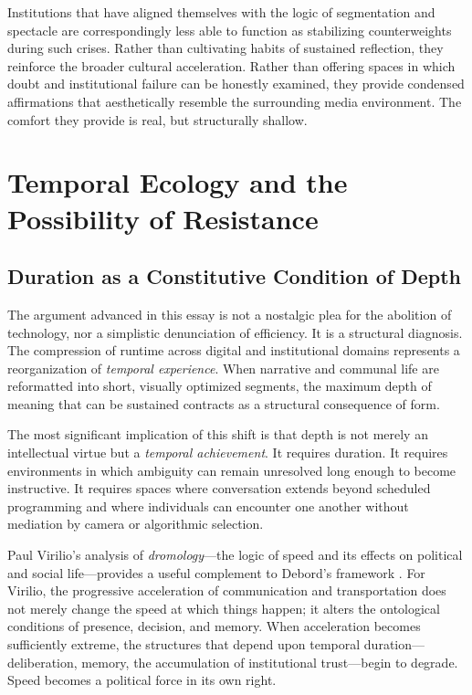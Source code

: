 \documentclass[11pt]{article}
\begin{document}
Institutions that have aligned themselves with the logic of segmentation and spectacle are correspondingly less able to function as stabilizing counterweights during such crises. Rather than cultivating habits of sustained reflection, they reinforce the broader cultural acceleration. Rather than offering spaces in which doubt and institutional failure can be honestly examined, they provide condensed affirmations that aesthetically resemble the surrounding media environment. The comfort they provide is real, but structurally shallow.

\section{Temporal Ecology and the Possibility of Resistance}
\label{sec:ecology}

\subsection{Duration as a Constitutive Condition of Depth}

The argument advanced in this essay is not a nostalgic plea for the abolition of technology, nor a simplistic denunciation of efficiency. It is a structural diagnosis. The compression of runtime across digital and institutional domains represents a reorganization of \emph{temporal experience}. When narrative and communal life are reformatted into short, visually optimized segments, the maximum depth of meaning that can be sustained contracts as a structural consequence of form.

The most significant implication of this shift is that depth is not merely an intellectual virtue but a \emph{temporal achievement}. It requires duration. It requires environments in which ambiguity can remain unresolved long enough to become instructive. It requires spaces where conversation extends beyond scheduled programming and where individuals can encounter one another without mediation by camera or algorithmic selection.

Paul Virilio's analysis of \emph{dromology}---the logic of speed and its effects on political and social life---provides a useful complement to Debord's framework \citep{Virilio1986}. For Virilio, the progressive acceleration of communication and transportation does not merely change the speed at which things happen; it alters the ontological conditions of presence, decision, and memory. When acceleration becomes sufficiently extreme, the structures that depend upon temporal duration---deliberation, memory, the accumulation of institutional trust---begin to degrade. Speed becomes a political force in its own right.
\end{document}
